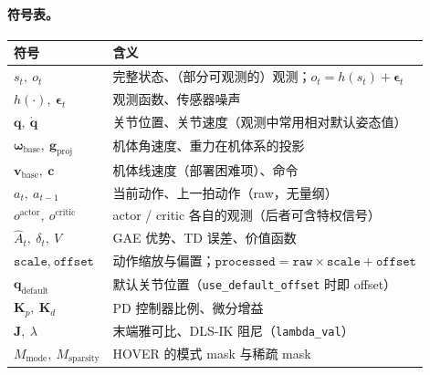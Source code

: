 \paragraph{符号表。}
\begin{center}
\small
\begin{tabular}{@{}ll@{}}
\toprule
符号 & 含义 \\
\midrule
$s_t,\ o_t$ & 完整状态、（部分可观测的）观测；$o_t=h(s_t)+\boldsymbol\epsilon_t$ \\
$h(\cdot),\ \boldsymbol\epsilon_t$ & 观测函数、传感器噪声 \\
$\mathbf q,\ \dot{\mathbf q}$ & 关节位置、关节速度（观测中常用相对默认姿态值） \\
$\boldsymbol\omega_{\text{base}},\ \mathbf g_{\text{proj}}$ & 机体角速度、重力在机体系的投影 \\
$\mathbf v_{\text{base}},\ \mathbf c$ & 机体线速度（部署困难项）、命令 \\
$a_t,\ a_{t-1}$ & 当前动作、上一拍动作（raw，无量纲） \\
$o^{\text{actor}},\ o^{\text{critic}}$ & actor / critic 各自的观测（后者可含特权信号） \\
$\hat A_t,\ \delta_t,\ V$ & GAE 优势、TD 误差、价值函数 \\
$\texttt{scale},\ \texttt{offset}$ & 动作缩放与偏置；$\texttt{processed}=\texttt{raw}\times\texttt{scale}+\texttt{offset}$ \\
$\mathbf q_{\text{default}}$ & 默认关节位置（\texttt{use\_default\_offset} 时即 offset） \\
$\mathbf K_p,\ \mathbf K_d$ & PD 控制器比例、微分增益 \\
$\mathbf J,\ \lambda$ & 末端雅可比、DLS-IK 阻尼（\texttt{lambda\_val}） \\
$M_{\text{mode}},\ M_{\text{sparsity}}$ & HOVER 的模式 mask 与稀疏 mask \\
\bottomrule
\end{tabular}
\end{center}

